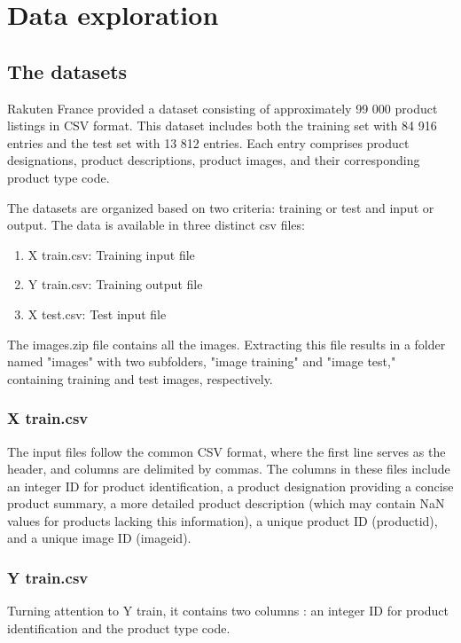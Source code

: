 \chapter{Data exploration}


\section{The datasets}
Rakuten France provided a dataset consisting of approximately 99 000 product listings in CSV format. This dataset includes both the training set with 84 916 entries and the test set with 13 812 entries. Each entry comprises product designations, product descriptions, product images, and their corresponding product type code.

The datasets are organized based on two criteria: training or test and input or output. The data is available in three distinct csv files:

\begin{enumerate}
    \item X train.csv: Training input file
    \item Y train.csv: Training output file
    \item X test.csv: Test input file
\end{enumerate}

The images.zip file contains all the images. Extracting this file results in a folder named "images" with two subfolders, "image training" and "image test," containing training and test images, respectively.

\subsection{X train.csv}
The input files follow the common CSV format, where the first line serves as the header, and columns are delimited by commas. The columns in these files include an integer ID for product identification, a product designation providing a concise product summary, a more detailed product description (which may contain NaN values for products lacking this information), a unique product ID (productid), and a unique image ID (imageid).

\subsection{Y train.csv}
Turning attention to Y train, it contains two columns : an integer ID for product identification and the product type code.

